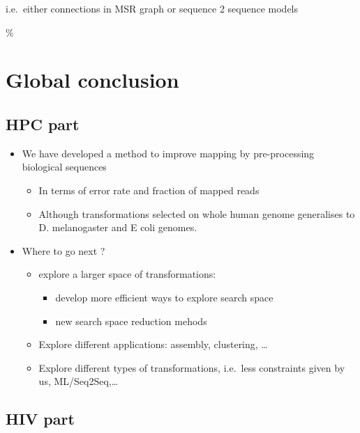 \documentclass[
  11pt,
  twoside,
  BCOR=10mm,
  listof=totoc]{scrbook}
\begin{document}
i.e.~either connections in MSR graph or sequence 2 sequence models

\% \printbibliography[segment=\therefsegment,heading=subbibintoc,title={References for chapter \thechapter}]

\hypertarget{global-conclusion}{%
\chapter*{Global conclusion}\label{global-conclusion}}

\hypertarget{hpc-part}{%
\section*{HPC part}\label{hpc-part}}

\begin{itemize}
\item
  We have developed a method to improve mapping by pre-processing biological sequences

  \begin{itemize}
  \item
    In terms of error rate and fraction of mapped reads
  \item
    Although transformations selected on whole human genome generalises to D. melanogaster and E coli genomes.
  \end{itemize}
\item
  Where to go next ?

  \begin{itemize}
  \item
    explore a larger space of transformations:

    \begin{itemize}
    \item
      develop more efficient ways to explore search space
    \item
      new search space reduction mehods
    \end{itemize}
  \item
    Explore different applications: assembly, clustering, \ldots{}
  \item
    Explore different types of transformations, i.e.~less constraints given by us, ML/Seq2Seq,\ldots{}
  \end{itemize}
\end{itemize}

\hypertarget{hiv-part}{%
\section*{HIV part}\label{hiv-part}}
\end{document}
